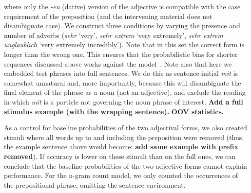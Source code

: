 where only the \emph{-en} (dative) version of the adjective is
compatible with the case requirement of the preposition (and the
intervening material does not disambiguate case). We construct three
conditions by varying the presence and number of adverbs (\emph{sehr}
`very', \emph{sehr extrem} `very extremely', \emph{sehr extrem
  unglaublich} `very extremely incredibly').  Note that in this set
the correct form is longer than the wrong one. This ensures that the
probabilistic bias for shorter sequences discussed above works against
the model~\cite{sountsov2016length}. Note also that here we embedded
test phrases into full sentences. We do this as sentence-initial
\emph{mit} is somewhat unnatural and, more importantly, because this
will disambiguate the final element of the phrase as a noun (not an
adjective), and exclude the reading in which \emph{mit} is a particle
not governing the noun phrase of interest. \textbf{Add a full stimulus
  example (with the wrapping sentence).} \textbf{OOV statistics.}

As a control for baseline probabilities of the two adjectival forms,
we also created stimuli where all words up to and including the
preposition were removed (thus, the example sentence above would
become: \textbf{add same example with prefix removed}).  If accuracy is lower on these stimuli than
on the full ones, we can conclude that the baseline probabilities of
the two adjective forms cannot explain performance. For the
n-gram count model, we only counted the occurrences of the
prepositional phrase, omitting the sentence environment.


